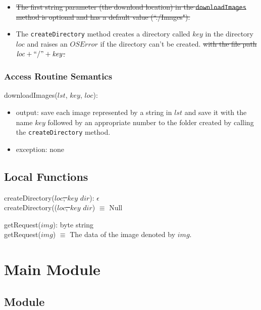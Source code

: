 \documentclass{article}
\begin{document}
\begin{itemize}
\item \st{The first string parameter (the download location) in the \texttt{downloadImages} method is optional and has a default value (``./Images").}
\item The \texttt{createDirectory} method creates a directory 
\color{red}called $\mathit{key}$ in the directory $\mathit{loc}$ and raises an $\mathit{OSError}$ if the directory can't be created. \color{black} \st{with the file path $\mathit{loc} + ``/" + \mathit{key}$.}
\end{itemize}

\subsubsection* {Access Routine Semantics}

\noindent downloadImages($lst$, $key$, $loc$):
\begin{itemize}
\item output: save each image represented by a string in $lst$ and save it \color{red} with the name $key$ followed by an appropriate number \color{black} to the folder created by \color{red}calling \color{black} the \texttt{createDirectory} method.
\item exception: none
\end{itemize}

\subsection* {Local Functions}

\noindent createDirectory(\st{$loc$, $key$} \color{red}$dir$\color{black}): $\epsilon$ \\
createDirectory((\st{$loc$, $key$} \color{red}$dir$\color{black}) $\equiv$ Null

\medskip

\color{red}
\noindent getRequest($img$): byte string \\
getRequest($img$) $\equiv$ The data of the image denoted by $img$.
\color{black}

\newpage

\section*{Main Module}

\subsection* {Module}
\end{document}
